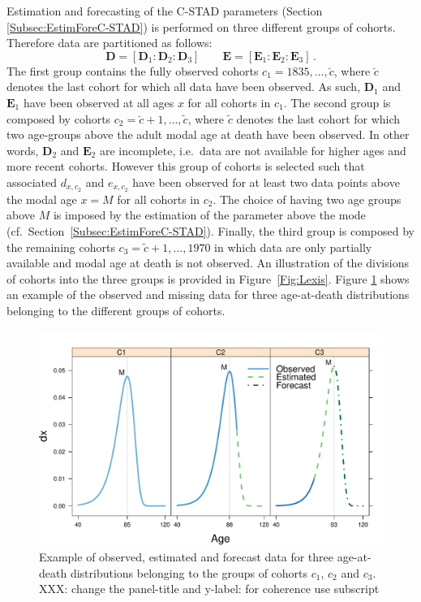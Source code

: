\documentclass[11pt, a4paper]{article}
\begin{document}
Estimation and forecasting of the C-STAD parameters (Section \ref{Subsec:EstimForeC-STAD}) is performed on three different groups of cohorts. Therefore data are partitioned as follows:
\begin{equation}\label{eq:DataDiv}
\bm{D} = \left[ \bm{D}_{1} : \bm{D}_{2} : \bm{D}_{3}\right] \qquad \bm{E} = \left[ \bm{E}_{1} : \bm{E}_{2} : \bm{E}_{3}\right] \, .
\end{equation}
The first group contains the fully observed cohorts $c_1 =1835,\ldots,\breve{c}$, where $\breve{c}$ denotes the last cohort for which all data have been observed. As such, $\bm{D}_{1}$ and $\bm{E}_{1}$ have been observed at all ages $x$ for all cohorts in $c_1$. The second group is composed by cohorts $c_2 =\breve{c}+1, \ldots, \tilde{c}$, where $\tilde{c}$ denotes the last cohort for which two age-groups above the adult modal age at death have been observed. In other words, $\bm{D}_{2}$ and $\bm{E}_{2}$ are incomplete, i.e.~data are not available for higher ages and more recent cohorts. However this group of cohorts is selected such that associated $d_{x,c_{2}}$ and $e_{x,c_{2}}$ have been observed for at least two data points above the modal age $x=M$ for all cohorts in $c_2$. The choice of having two age groups above $M$ is imposed by the estimation of the parameter above the mode (cf.~Section~\ref{Subsec:EstimForeC-STAD}). Finally, the third group is composed by the remaining cohorts $c_3 =\tilde{c}+1, \ldots, 1970$ in which data are only partially available and modal age at death is not observed. An illustration of the divisions of cohorts into the three groups is provided in Figure~\ref{Fig:Lexis}. Figure \ref{Fig:DxExample} shows an example of the observed and missing data for three age-at-death distributions belonging to the different groups of cohorts. 

\begin{figure}[t]
	\begin{center}
		\includegraphics[scale=0.7]{./Figures/F3.pdf} 
		\caption{Example of observed, estimated and forecast data for three age-at-death distributions belonging to the groups of cohorts $c_1$, $c_2$ and $c_3$. XXX: change the panel-title and y-label: for coherence use subscript\label{Fig:DxExample} }    
	\end{center}
\end{figure}
\end{document}
